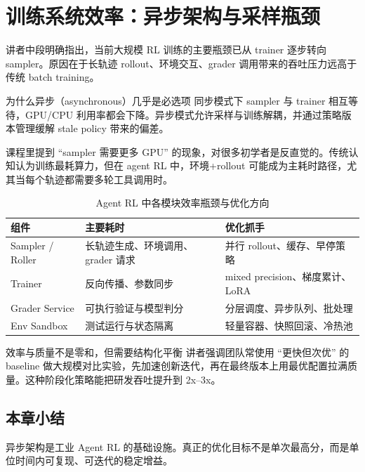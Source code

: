 \section{训练系统效率：异步架构与采样瓶颈}

讲者中段明确指出，当前大规模 RL 训练的主要瓶颈已从 trainer 逐步转向 sampler。原因在于长轨迹 rollout、环境交互、grader 调用带来的吞吐压力远高于传统 batch training。

\begin{knowledgebox}{为什么异步（asynchronous）几乎是必选项}
同步模式下 sampler 与 trainer 相互等待，GPU/CPU 利用率都会下降。异步模式允许采样与训练解耦，并通过策略版本管理缓解 stale policy 带来的偏差。
\end{knowledgebox}

课程里提到 ``sampler 需要更多 GPU'' 的现象，对很多初学者是反直觉的。传统认知认为训练最耗算力，但在 agent RL 中，环境+rollout 可能成为主耗时路径，尤其当每个轨迹都需要多轮工具调用时。

\begin{table}[H]
\centering
\begin{tabular}{p{2.8cm}p{3.8cm}p{3.9cm}}
\toprule
\textbf{组件} & \textbf{主要耗时} & \textbf{优化抓手} \\
\midrule
Sampler / Roller & 长轨迹生成、环境调用、grader 请求 & 并行 rollout、缓存、早停策略 \\
Trainer & 反向传播、参数同步 & mixed precision、梯度累计、LoRA \\
Grader Service & 可执行验证与模型判分 & 分层调度、异步队列、批处理 \\
Env Sandbox & 测试运行与状态隔离 & 轻量容器、快照回滚、冷热池 \\
\bottomrule
\end{tabular}
\caption{Agent RL 中各模块效率瓶颈与优化方向}
\end{table}

\begin{importantbox}{效率与质量不是零和，但需要结构化平衡}
讲者强调团队常使用 ``更快但次优'' 的 baseline 做大规模对比实验，先加速创新迭代，再在最终版本上用最优配置拉满质量。这种阶段化策略能把研发吞吐提升到 2x--3x。
\end{importantbox}

\subsection{本章小结}
异步架构是工业 Agent RL 的基础设施。真正的优化目标不是单次最高分，而是单位时间内可复现、可迭代的稳定增益。

